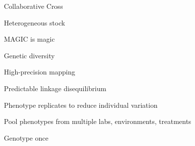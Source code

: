 \documentclass[12pt,t,aspectratio=169]{beamer}
\begin{document}
\begin{frame}[c]{Collaborative Cross}


\end{frame}



\begin{frame}[c]{Heterogeneous stock}

  \vspace{2mm}


\end{frame}


\begin{frame}[c]{MAGIC is magic}

\bbi
\item Genetic diversity

\item High-precision mapping

\item Predictable linkage disequilibrium

\item Phenotype replicates to reduce individual variation

\item Pool phenotypes from multiple labs, environments, treatments

\item Genotype once


\ei

\end{frame}
\end{document}
